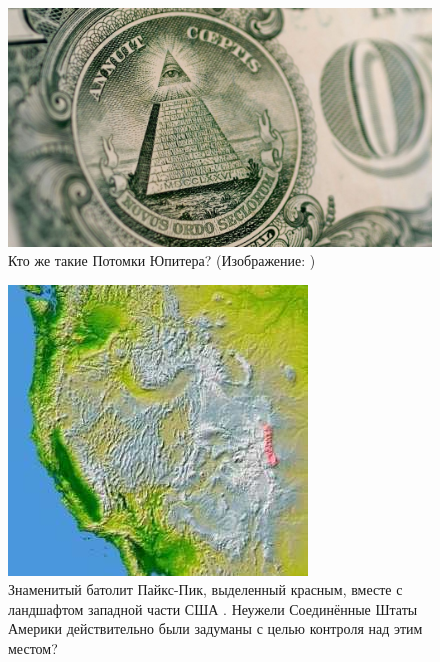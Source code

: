 \documentclass[10pt,twocolumn,letterpaper]{article}
\begin{document}
\begin{figure}[t]
\begin{center}

   \includegraphics[width=1\linewidth]{illuminati.jpg}
\end{center}
   \caption{Кто же такие Потомки Юпитера? (Изображение: \cite{35})}
\label{fig:10}
\label{fig:onecol}
\end{figure}

\begin{figure}[t]
\begin{center}
   \includegraphics[width=1\linewidth]{pike.jpg}
\end{center}
   \caption{Знаменитый батолит Пайкс-Пик, выделенный красным, вместе с ландшафтом западной части США \cite{36}. Неужели Соединённые Штаты Америки действительно были задуманы с целью контроля над этим местом?}
\label{fig:11}
\label{fig:onecol}
\end{figure}
\end{document}
